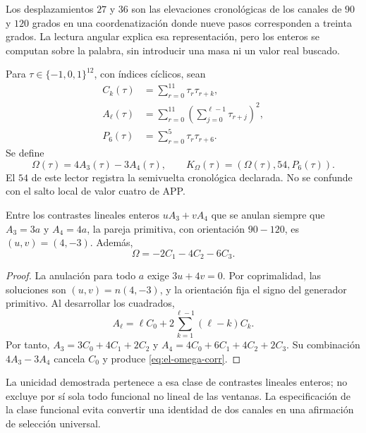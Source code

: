 Los desplazamientos \(27\) y \(36\) son las elevaciones
cronológicas de los canales de \(90\) y \(120\) grados en una coordenatización
donde nueve pasos corresponden a treinta grados. La lectura angular
explica esa representación, pero los enteros se computan sobre la
palabra, sin introducir una masa ni un valor real buscado.

\begin{definition}
Para \(\tau\in\{-1,0,1\}^{12}\), con índices cíclicos, sean
\begin{align*}
 C_k(\tau)&=\sum_{r=0}^{11}\tau_r\tau_{r+k},\\
 A_\ell(\tau)&=\sum_{r=0}^{11}
           \left(\sum_{j=0}^{\ell-1}\tau_{r+j}\right)^2,\\
 P_6(\tau)&=\sum_{r=0}^{5}\tau_r\tau_{r+6}.
\end{align*}
Se define
\begin{equation}
 \Omega(\tau)=4A_3(\tau)-3A_4(\tau),\qquad
 K_\Omega(\tau)=(\Omega(\tau),54,P_6(\tau)).
 \label{eq:el-komega}
\end{equation}
El \(54\) de este lector registra la semivuelta cronológica declarada.
No se confunde con el salto local de valor cuatro de APP.
\end{definition}

\begin{lemma}
Entre los contrastes lineales enteros \(uA_3+vA_4\) que se anulan
siempre que \(A_3=3a\) y \(A_4=4a\), la pareja primitiva, con
orientación \(90-120\), es \((u,v)=(4,-3)\). Además,
\begin{equation}
 \Omega=-2C_1-4C_2-6C_3.
 \label{eq:el-omega-corr}
\end{equation}
\end{lemma}
\begin{proof}
La anulación para todo \(a\) exige \(3u+4v=0\). Por coprimalidad,
las soluciones son \((u,v)=n(4,-3)\), y la orientación fija el signo
del generador primitivo. Al desarrollar los cuadrados,
\[
 A_\ell=\ell C_0+2\sum_{k=1}^{\ell-1}(\ell-k)C_k.
\]
Por tanto,
\(A_3=3C_0+4C_1+2C_2\) y
\(A_4=4C_0+6C_1+4C_2+2C_3\). Su combinación \(4A_3-3A_4\)
cancela \(C_0\) y produce \eqref{eq:el-omega-corr}.
\end{proof}

La unicidad demostrada pertenece a esa clase de contrastes lineales
enteros; no excluye por sí sola todo funcional no lineal de las ventanas.
La especificación de la clase funcional evita convertir una identidad
de dos canales en una afirmación de selección universal.

